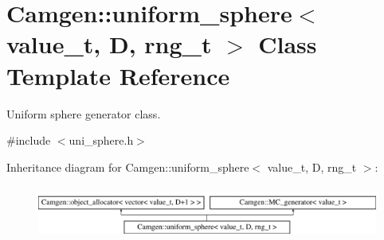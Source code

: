 \hypertarget{a00566}{}\section{Camgen\+:\+:uniform\+\_\+sphere$<$ value\+\_\+t, D, rng\+\_\+t $>$ Class Template Reference}
\label{a00566}


Uniform sphere generator class.  




{\ttfamily \#include $<$uni\+\_\+sphere.\+h$>$}

Inheritance diagram for Camgen\+:\+:uniform\+\_\+sphere$<$ value\+\_\+t, D, rng\+\_\+t $>$\+:\begin{figure}[H]
\begin{center}
\leavevmode
\includegraphics[height=1.755486cm]{a00566}
\end{center}
\end{figure}
